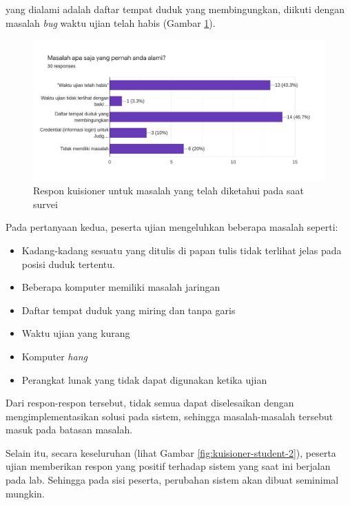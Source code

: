     yang dialami adalah daftar tempat duduk yang membingungkan, diikuti dengan
    masalah \textit{bug} waktu ujian telah habis (Gambar
    \ref{fig:kuisioner-student-1}).
    \begin{figure}
        \centering
        \includegraphics[width=0.7\paperwidth]{Gambar/survey-student.pdf}
        \caption{Respon kuisioner untuk masalah yang telah diketahui pada saat survei}
        \label{fig:kuisioner-student-1}
    \end{figure}
    
    Pada pertanyaan kedua, peserta ujian mengeluhkan beberapa masalah seperti:
    \begin{itemize}
        \item Kadang-kadang sesuatu yang ditulis di papan tulis tidak terlihat
        jelas pada posisi duduk tertentu.
        
        \item Beberapa komputer memiliki masalah jaringan
        
        \item Daftar tempat duduk yang miring dan tanpa garis
        
        \item Waktu ujian yang kurang
        
        \item Komputer \textit{hang}
        
        \item Perangkat lunak yang tidak dapat digunakan ketika ujian
    \end{itemize}
    Dari respon-respon tersebut, tidak semua dapat diselesaikan dengan
    mengimplementasikan solusi pada sistem, sehingga masalah-masalah tersebut
    masuk pada batasan masalah.
    
    Selain itu, secara keseluruhan (lihat Gambar \ref{fig:kuisioner-student-2}),
    peserta ujian memberikan respon yang positif terhadap sistem yang saat ini
    berjalan pada lab. Sehingga pada sisi peserta, perubahan sistem akan dibuat
    seminimal mungkin.
    
